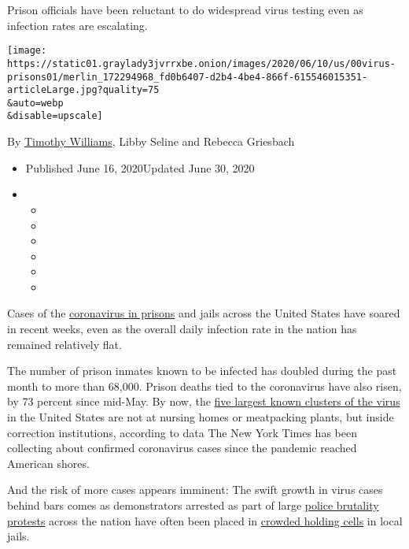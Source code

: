 Prison officials have been reluctant to do widespread virus testing even
as infection rates are escalating.

\texttt{[image: https://static01.graylady3jvrrxbe.onion/images/2020/06/10/us/00virus-prisons01/merlin\_172294968\_fd0b6407-d2b4-4be4-866f-615546015351-articleLarge.jpg?quality=75\\\&auto=webp\\\&disable=upscale]}

By \href{https://www.nytimes3xbfgragh.onion/by/timothy-williams}{Timothy
Williams}, Libby Seline and Rebecca Griesbach

\begin{itemize}
\item
  Published June 16, 2020Updated June 30, 2020
\item
  \begin{itemize}
  \item
  \item
  \item
  \item
  \item
  \item
  \end{itemize}
\end{itemize}

Cases of the
\href{https://www.nytimes3xbfgragh.onion/2020/07/30/nyregion/New-jersey-inmate-release-Covid.html}{coronavirus
in prisons} and jails across the United States have soared in recent
weeks, even as the overall daily infection rate in the nation has
remained relatively flat.

The number of prison inmates known to be infected has doubled during the
past month to more than 68,000. Prison deaths tied to the coronavirus
have also risen, by 73 percent since mid-May. By now, the
\href{https://www.nytimes3xbfgragh.onion/interactive/2020/us/coronavirus-us-cases.html\#clusters}{five
largest known clusters of the virus} in the United States are not at
nursing homes or meatpacking plants, but inside correction institutions,
according to data The New York Times has been collecting about confirmed
coronavirus cases since the pandemic reached American shores.

And the risk of more cases appears imminent: The swift growth in virus
cases behind bars comes as demonstrators arrested as part of large
\href{https://www.nytimes3xbfgragh.onion/news-event/george-floyd-protests-minneapolis-new-york-los-angeles}{police
brutality protests} across the nation have often been placed in
\href{https://www.nytimes3xbfgragh.onion/2020/06/04/nyregion/nyc-protests-jail.html}{crowded
holding cells} in local jails.

